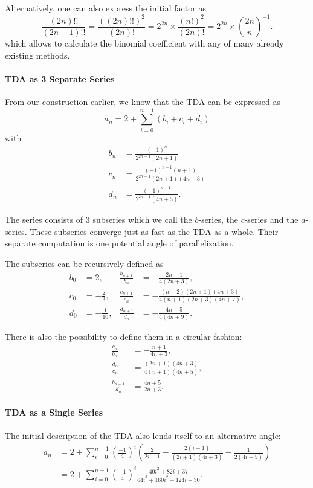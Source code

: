 \documentclass[a4paper,11pt]{scrartcl}
\theoremstyle{definition}
\theoremstyle{plain}
\theoremstyle{remark}
\begin{document}
Alternatively, one can also express the initial factor as
\[
\frac{(2n)!!}{(2n-1)!!}
= \frac{((2n)!!)^2}{(2n)!}
= 2^{2n} \times \frac{(n!)^2}{(2n)!}
= 2^{2n} \times \binom{2n}{n}^{-1}.
\]
which allows to calculate the binomial coefficient with any of many already existing methods.

\paragraph*{TDA as 3 Separate Series}
From our construction earlier, we know that the TDA can be expressed as
\[
a_n = 2 + \sum_{i=0}^{n-1}(b_i + c_i + d_i)
\]
with
\begin{align*}
b_n &= \frac{(-1)^n}{2^{2n-1}(2n+1)} \\
c_n &= \frac{(-1)^{n+1}(n+1)}{2^{2n-1}(2n+1)(4n+3)} \\
d_n &= \frac{(-1)^{n+1}}{2^{2n+1}(4n+5)}.
\end{align*}

The series consists of 3 subseries which we call the $b$-series, the $c$-series and the $d$-series.
These subseries converge just as fast as the TDA as a whole.
Their separate computation is one potential angle of parallelization.

The subseries can be recursively defined as
\begin{align*}
b_0 &= 2, &
\frac{b_{n+1}}{b_n} &= -\frac{2n+1}{4(2n+3)}, \\
c_0 &= -\frac{2}{3}, &
\frac{c_{n+1}}{c_n} &= -\frac{(n+2)(2n+1)(4n+3)}{4(n+1)(2n+3)(4n+7)}, \\
d_0 &= -\frac{1}{10}, &
\frac{d_{n+1}}{d_n} &= - \frac{4n+5}{4(4n+9)}.
\end{align*}

There is also the possibility to define them in a circular fashion:
\begin{align*}
\frac{c_n}{b_n} &= -\frac{n+1}{4n+3}, \\
\frac{d_n}{c_n} &= \frac{(2n+1)(4n+3)}{4(n+1)(4n+5)}, \\
\frac{b_{n+1}}{d_n} &= \frac{4n+5}{2n+3}.
\end{align*}

\paragraph*{TDA as a Single Series}
The initial description of the TDA also lends itself to an alternative angle:
\begin{align*}
a_n &= 2 + \sum_{i=0}^{n-1} \left(\frac{-1}{4}\right)^{i} \left(\frac{2}{2i+1} - \frac{2(i+1)}{(2i+1)(4i+3)} - \frac{1}{2(4i+5)}\right) \\
&= 2 + \sum_{i=0}^{n-1} \left(\frac{-1}{4}\right)^{i} \frac{40i^2 + 82i + 37}{64i^3 + 160i^2 + 124i + 30}.
\end{align*}
\end{document}
